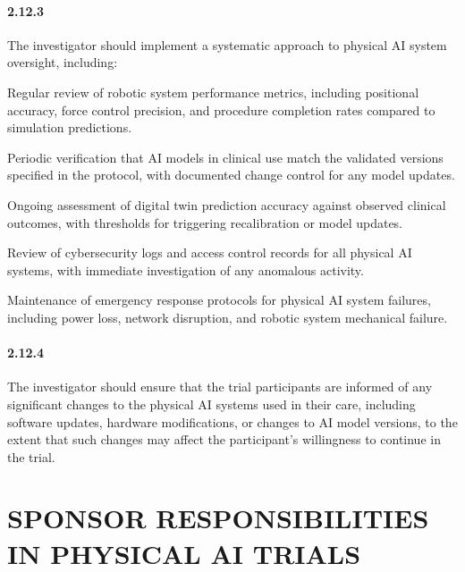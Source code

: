 \documentclass[11pt]{article}
\begin{document}
\paragraph{2.12.3} The investigator should implement a systematic approach to physical AI system oversight, including:

\begin{description}[leftmargin=2.5cm,style=sameline]

\item[(a)] Regular review of robotic system performance metrics, including positional accuracy, force control precision, and procedure completion rates compared to simulation predictions.

\item[(b)] Periodic verification that AI models in clinical use match the validated versions specified in the protocol, with documented change control for any model updates.

\item[(c)] Ongoing assessment of digital twin prediction accuracy against observed clinical outcomes, with thresholds for triggering recalibration or model updates.

\item[(d)] Review of cybersecurity logs and access control records for all physical AI systems, with immediate investigation of any anomalous activity.

\item[(e)] Maintenance of emergency response protocols for physical AI system failures, including power loss, network disruption, and robotic system mechanical failure.

\end{description}

\paragraph{2.12.4} The investigator should ensure that the trial participants are informed of any significant changes to the physical AI systems used in their care, including software updates, hardware modifications, or changes to AI model versions, to the extent that such changes may affect the participant's willingness to continue in the trial.

\section{SPONSOR RESPONSIBILITIES IN PHYSICAL AI TRIALS}
\end{document}
